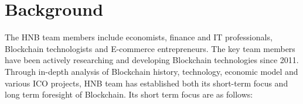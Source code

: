 \documentclass[fleqn,10pt]{SelfArx} %
\begin{document}
\flushbottom %

\maketitle %

\tableofcontents %

\thispagestyle{empty} %






\section{Background}


The HNB team members include economists, finance and IT professionals, Blockchain technologists and E-commerce entrepreneurs. The key team members have been actively researching and developing Blockchain technologies since 2011. Through in-depth analysis of Blockchain history, technology, economic model and various ICO projects, HNB team has established both its short-term focus and long term foresight of Blockchain. Its short term focus are as follows:
\end{document}
